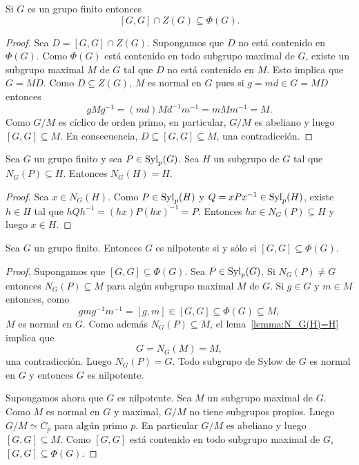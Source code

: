 \begin{theorem}
	\label{theorem:Gaschutz}
	Si $G$ es un grupo finito entonces 
	\[
	[G,G]\cap Z(G)\subseteq\Phi(G).
	\]
\end{theorem}

\begin{proof}
	Sea $D=[G,G]\cap Z(G)$. Supongamos que $D$ no está contenido en $\Phi(G)$.
	Como $\Phi(G)$ está contenido en todo subgrupo maximal de $G$, existe un
	subgrupo maximal $M$ de $G$ tal que $D$ no está contenido en $M$.  Esto
	implica que $G=MD$. Como $D\subseteq Z(G)$, $M$ es normal en $G$ pues si
	$g=md\in G=MD$ entonces
	\[
		gMg^{-1}=(md)Md^{-1}m^{-1}=mMm^{-1}=M.
	\]
	Como $G/M$ es cíclico de orden
	primo, en particular, $G/M$ es abeliano y luego $[G,G]\subseteq M$. En consecuencia, 
	$D\subseteq [G,G]\subseteq M$, una contradicción.
\end{proof}

\begin{lemma}
	\label{lemma:N_G(H)=H}
	Sea $G$ un grupo finito y sea $P\in\mathrm{Syl}_p(G)$. Sea $H$ un subgrupo de $G$
	tal que $N_G(P)\subseteq H$. Entonces $N_G(H)=H$.
\end{lemma}

\begin{proof}
	Sea $x\in N_G(H)$. Como $P\in\mathrm{Syl}_p(H)$ y $Q=xPx^{-1}\in\mathrm{Syl}_p(H)$, existe
	$h\in H$ tal que $hQh^{-1}=(hx)P(hx)^{-1}=P$. Entonces $hx\in
	N_G(P)\subseteq H$ y luego $x\in H$. 
\end{proof}

\begin{theorem}[Wielandt]
	\label{theorem:Wielandt}
	Sea $G$ un grupo finito. Entonces $G$ es nilpotente si y sólo si
	$[G,G]\subseteq\Phi(G)$.
\end{theorem}

\begin{proof}
	Supongamos que $[G,G]\subseteq\Phi(G)$. Sea $P\in\mathrm{Syl}_p(G)$. Si $N_G(P)\ne
	G$ entonces $N_G(P)\subseteq M$ para algún subgrupo maximal $M$ de $G$. Si
	$g\in G$ y $m\in M$ entonces, como 
	\[
		gmg^{-1}m^{-1}=[g,m]\in [G,G]\subseteq\Phi(G)\subseteq M,
	\]
	$M$ es normal en $G$. Como además $N_G(P)\subseteq M$, el
	lema~\ref{lemma:N_G(H)=H} implica que 
	\[
	G=N_G(M)=M,
	\]
	una contradicción.
	Luego $N_G(P)=G$. Todo subgrupo de Sylow de $G$ es normal en $G$ y entonces
	$G$ es nilpotente.

	Supongamos ahora que $G$ es nilpotente. Sea $M$ un subgrupo maximal de $G$.
	Como $M$ es normal en $G$ y maximal, $G/M$ no tiene subgrupos propios.
	Luego $G/M\simeq C_p$ para algún primo $p$. En particular $G/M$ es abeliano
	y luego $[G,G]\subseteq M$. Como $[G,G]$ está contenido en
	todo subgrupo maximal de $G$, $[G,G]\subseteq\Phi(G)$.
\end{proof}

